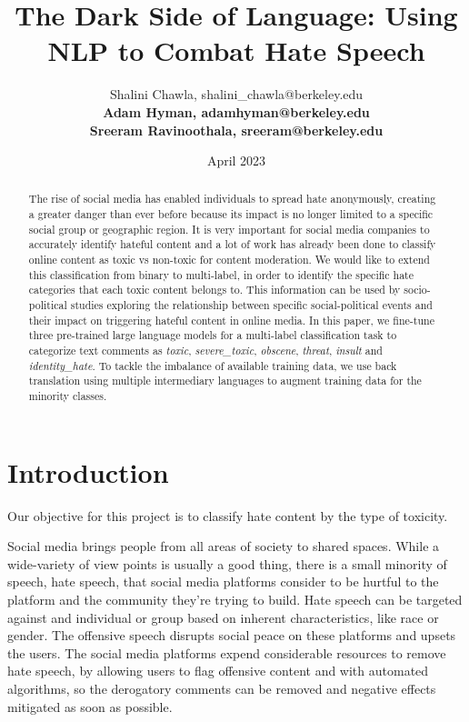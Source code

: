 \documentclass[11pt,a4paper]{article}
\title{The Dark Side of Language: Using NLP to Combat Hate Speech}
\author{ 
  Shalini Chawla, shalini\_chawla@berkeley.edu
  \\[2ex]
  \textbf{Adam Hyman, adamhyman@berkeley.edu}
  \\[2ex]
  \textbf{Sreeram Ravinoothala, sreeram@berkeley.edu} 
  }
\date{April 2023}
\begin{document}
\maketitle
\begin{abstract}
The rise of social media has enabled individuals to spread hate anonymously, creating a greater danger than ever before because its impact is no longer limited to a specific social group or geographic region. It is very important for social media companies to accurately identify hateful content and a lot of work has already been done to classify online content as toxic vs non-toxic for content moderation. We would like to extend this classification from binary to multi-label, in order to identify the specific hate categories that each toxic content belongs to. This information can be used by socio-political studies exploring the relationship between specific social-political events and their impact on triggering hateful content in online media. In this paper, we fine-tune three pre-trained large language models for a multi-label classification task to categorize text comments as \emph{toxic}, \emph{severe\_toxic}, \emph{obscene}, \emph{threat}, \emph{insult} and \emph{identity\_hate}. To tackle the imbalance of available training data, we use back translation using multiple intermediary languages to augment training data for the minority classes.

\end{abstract}

\section{Introduction}

Our objective for this project is to classify hate content by the type of toxicity.

Social media brings people from all areas of society to shared spaces.  While a wide-variety of view points is usually a good thing, there is a small minority of speech, hate speech, that social media platforms consider to be hurtful to the platform and the community they're trying to build.  Hate speech can be targeted against and individual or group based on inherent characteristics, like race or gender.  The offensive speech disrupts social peace on these platforms and upsets the users.  The social media platforms expend considerable resources to remove hate speech, by allowing users to flag offensive content and with automated algorithms, so the derogatory comments can be removed and negative effects mitigated as soon as possible.
\end{document}
